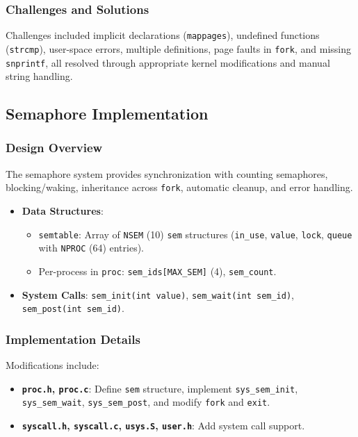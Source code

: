 \documentclass[12pt]{article}
\begin{document}
\subsubsection{Challenges and Solutions}
\label{subsubsec:shared-memory-challenges}

Challenges included implicit declarations (\texttt{mappages}), undefined functions (\texttt{strcmp}), user-space errors, multiple definitions, page faults in \texttt{fork}, and missing \texttt{snprintf}, all resolved through appropriate kernel modifications and manual string handling.

\subsection{Semaphore Implementation}
\label{subsec:semaphore-implementation}

\subsubsection{Design Overview}
\label{subsubsec:semaphore-design}

The semaphore system provides synchronization with counting semaphores, blocking/waking, inheritance across \texttt{fork}, automatic cleanup, and error handling.

\begin{itemize}
  \item \textbf{Data Structures}:
    \begin{itemize}
      \item \texttt{semtable}: Array of \texttt{NSEM} (10) \texttt{sem} structures (\texttt{in\_use}, \texttt{value}, \texttt{lock}, \texttt{queue} with \texttt{NPROC} (64) entries).
      \item Per-process in \texttt{proc}: \texttt{sem\_ids[MAX\_SEM]} (4), \texttt{sem\_count}.
    \end{itemize}
  \item \textbf{System Calls}: \texttt{sem\_init(int value)}, \texttt{sem\_wait(int sem\_id)}, \texttt{sem\_post(int sem\_id)}.
\end{itemize}

\subsubsection{Implementation Details}
\label{subsubsec:semaphore-implementation-details}

Modifications include:
\begin{itemize}
  \item \textbf{\texttt{proc.h}, \texttt{proc.c}}: Define \texttt{sem} structure, implement \texttt{sys\_sem\_init}, \texttt{sys\_sem\_wait}, \texttt{sys\_sem\_post}, and modify \texttt{fork} and \texttt{exit}.
  \item \textbf{\texttt{syscall.h}, \texttt{syscall.c}, \texttt{usys.S}, \texttt{user.h}}: Add system call support.
\end{itemize}
\end{document}
